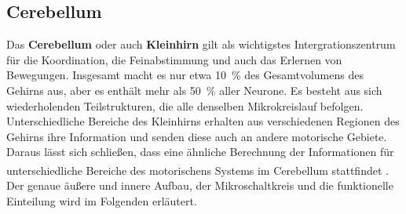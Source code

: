 \documentclass[12pt,a4paper,pdftex]{article}
\begin{document}
\subsection{Cerebellum} \label{sub:kleinhirn} 
Das \textbf{Cerebellum} oder auch \textbf{Kleinhirn} gilt als wichtigstes Intergrationszentrum für die Koordination, die Feinabstimmung und auch das Erlernen von Bewegungen. Insgesamt macht es nur etwa 10~\% des Gesamtvolumens des Gehirns aus, aber es enthält mehr als 50~\% aller Neurone. Es besteht aus sich wiederholenden Teilstrukturen, die alle denselben Mikrokreislauf befolgen. Unterschiedliche Bereiche des Kleinhirns erhalten aus verschiedenen Regionen des Gehirns ihre Information und senden diese auch an andere motorische Gebiete. Daraus lässt sich schließen, dass eine ähnliche Berechnung der Informationen für unterschiedliche Bereiche des motorischens Systems im Cerebellum stattfindet \textsuperscript{\cite[42]{kandel2013principles}}. Der genaue äußere und innere Aufbau, der Mikroschaltkreis und die funktionelle Einteilung wird im Folgenden erläutert.    
\end{document}
